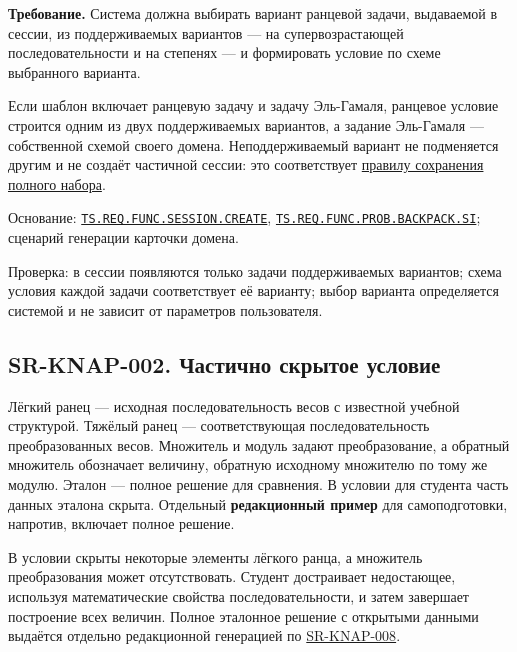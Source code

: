 \documentclass[12pt,a4paper]{article}
\begin{document}
\textbf{Требование.} Система должна выбирать вариант ранцевой задачи, выдаваемой в сессии, из поддерживаемых вариантов --- на супервозрастающей последовательности и на степенях --- и формировать условие по схеме выбранного варианта.

Если шаблон включает ранцевую задачу и задачу Эль-Гамаля, ранцевое условие строится одним из двух поддерживаемых вариантов, а задание Эль-Гамаля --- собственной схемой своего домена. Неподдерживаемый вариант не подменяется другим и не создаёт частичной сессии: это соответствует {\href{../07\_Программные\_требования/DOC-06.2\_Сессии\_задач\_и\_планировщик.pdf\#swr-ses-005-сохранение-созданного-набора}{правилу сохранения полного набора}}.

Основание: {\href{../02\_Техническое\_задание/DOC-02\_Техническое\_задание.pdf\#ts-req-func-session-create}{\texttt{TS.\allowbreak{}REQ.\allowbreak{}FUNC.\allowbreak{}SESSION.\allowbreak{}CREATE}}}, {\href{../02\_Техническое\_задание/DOC-02\_Техническое\_задание.pdf\#ts-req-func-prob-backpack-si}{\texttt{TS.\allowbreak{}REQ.\allowbreak{}FUNC.\allowbreak{}PROB.\allowbreak{}BACKPACK.\allowbreak{}SI}}}; сценарий генерации карточки домена.

Проверка: в сессии появляются только задачи поддерживаемых вариантов; схема условия каждой задачи соответствует её варианту; выбор варианта определяется системой и не зависит от параметров пользователя.

\subsection{SR-KNAP-002. Частично скрытое условие}\label{sr-knap-002-ux447ux430ux441ux442ux438ux447ux43dux43e-ux441ux43aux440ux44bux442ux43eux435-ux443ux441ux43bux43eux432ux438ux435}

\hypertarget{sr-knap-002-частично-скрытое-условие}{}

\hypertarget{sr-knap-002}{}

Лёгкий ранец --- исходная последовательность весов с известной учебной структурой. Тяжёлый ранец --- соответствующая последовательность преобразованных весов. Множитель и модуль задают преобразование, а обратный множитель обозначает величину, обратную исходному множителю по тому же модулю. Эталон --- полное решение для сравнения. В условии для студента часть данных эталона скрыта. Отдельный \textbf{редакционный пример} для самоподготовки, напротив, включает полное решение.

В условии скрыты некоторые элементы лёгкого ранца, а множитель преобразования может отсутствовать. Студент достраивает недостающее, используя математические свойства последовательности, и затем завершает построение всех величин. Полное эталонное решение с открытыми данными выдаётся отдельно редакционной генерацией по {\hyperlink{sr-knap-008}{SR-KNAP-008}}.
\end{document}
